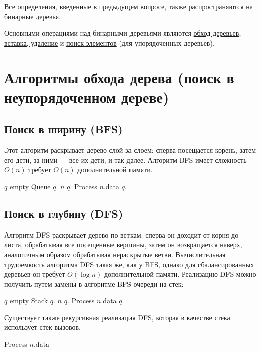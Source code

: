 Все определения, введенные в предыдущем вопросе, также распространяются на бинарные деревья.

Основными операциями над бинарными деревьями являются \hyperref[sec:bintree-traversal]{обход деревьев},
\hyperref[sec:tree-ins-del]{вставка, удаление} и \hyperref[sec:bst-search]{поиск элементов} (для упорядоченных деревьев).

\section{Алгоритмы обхода дерева (поиск в неупорядоченном дереве)}
\label{sec:tree-traversal}

\subsection{Поиск в ширину (BFS)}
Этот алгоритм раскрывает дерево слой за слоем:
сперва посещается корень, затем его дети, за ними ---
все их дети, и так далее. Алгоритм BFS имеет сложность $O(n)$ требует
$O(n)$ дополнительной памяти.
\begin{algorithmic}
  \State $q$ \asgn empty Queue
  \State $q$.
    \State $n$ \asgn $q$.
    \State Process $n$.data
      $q$.
    \EndFor
  \EndWhile
\EndProcedure
\end{algorithmic}

\subsection{Поиск в глубину (DFS)}
Алгоритм DFS раскрывает дерево по веткам: сперва он доходит от корня до листа,
обрабатывая все посещенные вершины, затем он возвращается наверх, аналогичным
образом обрабатывая нераскрытые ветви. Вычислительная трудоемкость алгоритма
DFS такая же, как у BFS, однако для сбалансированных деревьев он требует $O(\log n)$
дополнительной памяти.
Реализацию DFS можно получить путем замены в алгоритме BFS очереди на стек:
\begin{algorithmic}
  \State $q$ \asgn empty Stack
  \State $q$.
    \State $n$ \asgn $q$.
    \State Process $n$.data
      $q$.
    \EndFor
  \EndWhile
\EndProcedure
\end{algorithmic}

Существует также рекурсивная реализация DFS, которая в качестве стека использует
стек вызовов.
\begin{algorithmic}
  \State Process $n$.data
    \State {}
  \EndFor
\EndProcedure
\end{algorithmic}

